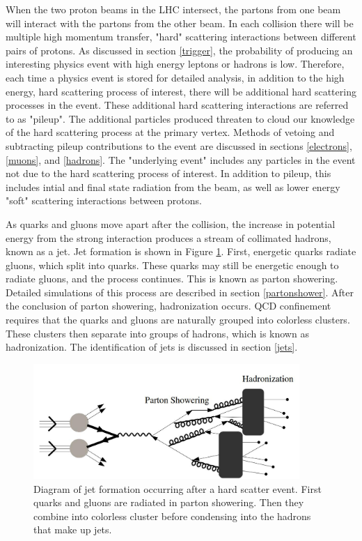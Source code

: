 \documentclass[oneside, letterpaper, oldfontcommands]{memoir}
\begin{document}
\qquad When the two proton beams in the LHC intersect, the partons from one beam will interact with the partons from the other beam. In each collision there will be multiple high momentum transfer, "hard" scattering interactions between different pairs of protons. As discussed in section \ref{trigger}, the probability of producing an interesting physics event with high energy leptons or hadrons is low. Therefore, each time a physics event is stored for detailed analysis, in addition to the high energy, hard scattering process of interest, there will be additional hard scattering processes in the event. These additional hard scattering interactions are referred to as "pileup". The additional particles produced threaten to cloud our knowledge of the hard scattering process at the primary vertex. Methods of vetoing and subtracting pileup contributions to the event are discussed in sections \ref{electrons}, \ref{muons}, and \ref{hadrons}. The "underlying event" includes any particles in the event not due to the hard scattering process of interest. In addition to pileup, this includes intial and final state radiation from the beam, as well as lower energy "soft" scattering interactions between protons. 

\qquad As quarks and gluons move apart after the collision, the increase in potential energy from the strong interaction produces a stream of collimated hadrons, known as a jet. Jet formation is shown in Figure \ref{fig:JetFormation}. First, energetic quarks radiate gluons, which split into quarks. These quarks may still be energetic enough to radiate gluons, and the process continues. This is known as parton showering. Detailed simulations of this process are described in section \ref{partonshower}. After the conclusion of parton showering, hadronization occurs. QCD confinement requires that the quarks and gluons are naturally grouped into colorless clusters. These clusters then separate into groups of hadrons, which is known as hadronization. The identification of jets is discussed in section \ref{jets}. 

\begin{figure}[here]
\includegraphics[width=0.9\textwidth]{jetformation.jpg}
\caption{Diagram of jet formation occurring after a hard scatter event. First quarks and gluons are radiated in parton showering. Then they combine into colorless cluster before condensing into the hadrons that make up jets.}
\label{fig:JetFormation}
\end{figure}
\end{document}

